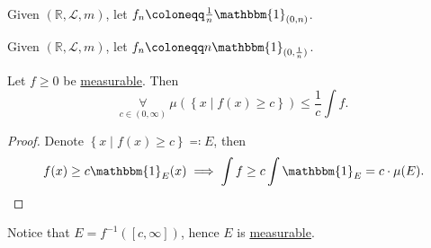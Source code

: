 \begin{eg}
	Given \((\mathbb{R} , \mathcal{L} , m)\), let \(f_{n}\coloneqq \frac{1}{n}\mathbbm{1}_{(0, n)} \).
\end{eg}

\begin{eg}
	Given \((\mathbb{R} , \mathcal{L} , m)\), let \(f_{n}\coloneqq n \mathbbm{1}_{(0, \frac{1}{n})} \).
\end{eg}

\begin{lemma}\label{lma:Markov-inequality}
	Let \(f\geq 0\) be \hyperref[def:measurable-function]{measurable}. Then
	\[
		\underset{c\in (0, \infty )}{\forall }\ \mu \left(\left\{x  \mid f(x)\geq c\right\}\right)\leq \frac{1}{c}\int f.
	\]
\end{lemma}
\begin{proof}
	Denote \(\left\{x  \mid f(x)\geq c\right\} \eqqcolon E\), then
	\[
		f(x)\geq c \mathbbm{1}_{E}(x) \implies \int f \geq c\int \mathbbm{1}_{E} = c\cdot \mu (E).
	\]
\end{proof}
\begin{remark}
	Notice that \(E = f^{-1} ([c, \infty])\), hence \(E\) is \hyperref[def:measurable-space]{measurable}.
\end{remark}

